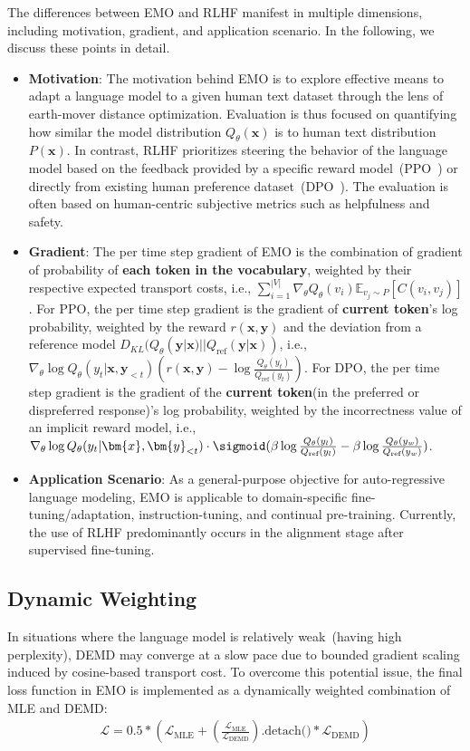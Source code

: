 The differences between EMO and RLHF manifest in multiple dimensions, including motivation, gradient, and application scenario. In the following, we discuss these points in detail.
\begin{itemize}
    \item \textbf{Motivation}: The motivation behind EMO is to explore effective means to adapt a language model to a given human text dataset through the lens of earth-mover distance optimization. Evaluation is thus focused on quantifying how similar the model distribution $Q_{\theta}(\bm{x})$ is to human text distribution $P(\bm{x})$. In contrast, RLHF prioritizes steering the behavior of the language model based on the feedback provided by a specific reward model~(PPO~\citep{ppo}) or directly from existing human preference dataset~(DPO~\citep{dpo}). The evaluation is often based on human-centric subjective metrics such as helpfulness and safety. 
    \item \textbf{Gradient}: The per time step gradient of EMO is the combination of gradient of probability of \textbf{each token in the vocabulary}, weighted by their respective expected transport costs, i.e., $\sum_{i=1}^{|V|}\nabla_{\theta}Q_{\theta}(v_i)\mathbb{E}_{v_j\sim P}[C(v_i,v_j)]$. For PPO, the per time step gradient is the gradient of \textbf{current token}'s log probability, weighted by the reward $r(\bm{x},\bm{y})$ and the deviation from a reference model $D_{KL}(Q_{\theta}(\bm{y}|\bm{x})||Q_{\text{ref}}(\bm{y}|\bm{x}))$, i.e., $\nabla_{\theta}\log{Q_{\theta}(y_t|\bm{x},\bm{y}_{<t})}(r(\bm{x},\bm{y})-\log{\frac{Q_{\theta}(y_t)}{Q_{\text{ref}}(y_t)}})$. For DPO, the per time step gradient is the gradient of the \textbf{current token}(in the preferred or dispreferred response)'s log probability, weighted by the incorrectness value of an implicit reward model, i.e., $\nabla_{\theta}\log{Q_{\theta}(y_t|\bm{x},\bm{y}_{<t})}\cdot \sigmoid(\beta\log{\frac{Q_{\theta}(y_l)}{Q_{\text{ref}}(y_l)}}-\beta\log{\frac{Q_{\theta}(y_w)}{Q_{\text{ref}}(y_w)}})$.
    \item \textbf{Application Scenario}: As a general-purpose objective for auto-regressive language modeling, EMO is applicable to domain-specific fine-tuning/adaptation, instruction-tuning, and continual pre-training. Currently, the use of RLHF predominantly occurs in the alignment stage after supervised fine-tuning.
\end{itemize}


\subsection{Dynamic Weighting}
\label{appendix:dynamic}
In situations where the language model is relatively weak~(having high perplexity), DEMD may converge at a slow pace due to bounded gradient scaling induced by cosine-based transport cost. To overcome this potential issue, the final loss function in EMO is implemented as a dynamically weighted combination of MLE and DEMD:
\begin{align}
    \mathcal{L}=0.5*(\mathcal{L}_{\text{MLE}} + (\frac{\mathcal{L}_{\text{MLE}}}{\mathcal{L}_{\text{DEMD}}}).\text{detach()}*\mathcal{L}_{\text{DEMD}})
\end{align}
